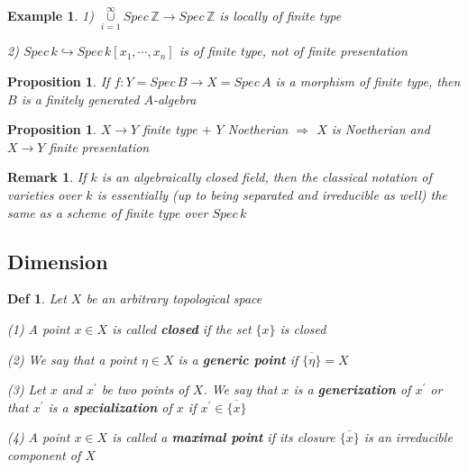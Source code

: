 \documentclass{article}
\newtheorem{definition}[theorem]{Def}
\newtheorem{example}[theorem]{Example}
\newtheorem{proposition}[theorem]{Proposition}
\newtheorem{remark}[theorem]{Remark}
\begin{document}
\begin{example}
    1) $\mathop{\cup}\limits_{i=1}^{\infty}Spec\,\mathbb Z\to Spec\,\mathbb Z$ is locally of finite type

    2) $Spec\, k \hookrightarrow
    Spec\, k[x_1,\cdots,x_n]$ is of finite type, not of finite presentation
\end{example}

\begin{proposition}
    If $f:Y = Spec\, B \to X = Spec\, A$ is a morphism of finite type, then $B$ is a finitely generated $A$-algebra
\end{proposition}

\begin{proposition}
    $X\to Y$ finite type $+$ $Y$ Noetherian $\Rightarrow$ $X$ is Noetherian and $X\to Y$ finite presentation
\end{proposition}



\begin{remark}
    If $k$ is an algebraically closed field, then the classical notation of varieties over $k$ is essentially (up to being separated and irreducible as well) the same as a scheme of finite type over $Spec\, k$
\end{remark}




\newpage
\subsection{Dimension}

\begin{definition}
    Let $X$ be an arbitrary topological space
    
(1) A point $x \in X$ is called \textbf{closed} if the set $\{x\}$ is closed

(2) We say that a point $\eta \in X$ is a \textbf{generic point} if $\overline{\{\eta\}} = X$

(3) Let $x$ and $x^\prime$ be two points of $X$. We say that $x$ is a \textbf{generization} of $x^\prime$ or that $x^\prime$ is a \textbf{specialization} of $x$ if $x^\prime \in \overline{\{x\}}$ 

(4) A point $x \in X$ is called a \textbf{maximal point} if its closure $\overline{\{x\}}$ is an irreducible component of $X$
\end{definition}
\end{document}
